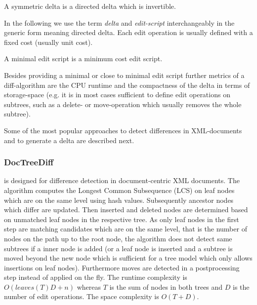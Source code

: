 \begin{mydef}
A symmetric delta is a directed delta which is invertible.
\end{mydef}

In the following we use the term \emph{delta} and \emph{edit-script} interchangeably in the generic form meaning directed delta. Each edit operation is usually defined with a fixed cost (usually unit cost).

\begin{mydef}
A minimal edit script is a minimum cost edit script.
\end{mydef}

Besides providing a minimal or close to minimal edit script further metrics of a diff-algorithm are the CPU runtime and the compactness of the delta in terms of storage-space (e.g. it is in most cases sufficient to define edit operations on subtrees, such as a delete- or move-operation which usually removes the whole subtree).

Some of the most popular approaches to detect differences in XML-documents and to generate a delta are described next.

\subsubsection{DocTreeDiff\cite{ronnau2009efficient}}
is designed for difference detection in document-centric XML documents. The algorithm computes the Longest Common Subsequence (LCS) on leaf nodes which are on the same level using hash values. Subsequently ancestor nodes which differ are updated. Then inserted and deleted nodes are determined based on unmatched leaf nodes in the respective tree. As only leaf nodes in the first step are matching candidates which are on the same level, that is the number of nodes on the path up to the root node, the algorithm does not detect same subtrees if a inner node is added (or a leaf node is inserted and a subtree is moved beyond the new node which is sufficient for a tree model which only allows insertions on leaf nodes). Furthermore moves are detected in a postprocessing step instead of applied on the fly. The runtime complexity is $O(leaves(T)D + n)$ whereas $T$ is the sum of nodes in both trees and $D$ is the number of edit operations. The space complexity is $O(T+D)$.%

